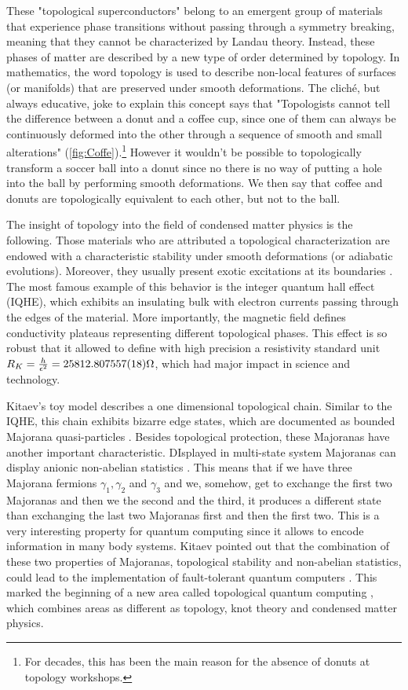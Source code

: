 These "topological superconductors" belong to an emergent group of materials that experience phase transitions without passing through a symmetry breaking, meaning that they cannot be characterized by Landau theory. Instead, these phases of matter are described by  a new type of  order determined by topology. In mathematics, the word topology is used to describe non-local features of surfaces (or manifolds) that are preserved under smooth deformations. The clich\'e, but always educative, joke to explain this concept says that "Topologists cannot tell the difference between a donut and a coffee cup, since one of them 
can always be continuously deformed into the other through a
sequence of smooth and small alterations" (\ref{fig:Coffe}).\footnote{For decades, this has been the main reason for the absence of donuts at topology workshops.} However it wouldn't be possible to topologically transform a soccer ball into  a donut since no there is no way of putting  a hole into the ball by performing smooth deformations. We then say that coffee and donuts are topologically equivalent to each other, but not to the ball. 



The insight of topology into  the field of condensed matter physics is the following. Those materials who are attributed a topological characterization are endowed with a characteristic stability under smooth deformations (or adiabatic evolutions). Moreover, they usually present exotic excitations at its boundaries . The most famous example of this behavior is the integer quantum hall effect (IQHE), which exhibits an insulating bulk with electron currents passing through the edges of the material. More importantly, the magnetic field defines conductivity plateaus representing different topological phases. This effect is so robust that it allowed to define with high precision a resistivity standard unit $ R_K =\frac{h}{\epsilon^2} = 25812.807557(18) \Omega$, which had major impact in science and technology. 


Kitaev's toy model describes a one dimensional  topological chain. Similar to the IQHE, this chain exhibits bizarre edge states, which are documented as bounded Majorana quasi-particles . Besides topological protection, these Majoranas have another important characteristic. DIsplayed in multi-state system Majoranas can display anionic non-abelian statistics \citep{kitaev_fault-tolerant_2003}. This means that if we have three Majorana fermions $\gamma_1 ,\gamma_2 $ and $\gamma_3$ and we, somehow, get to exchange the first two Majoranas and then we  the second and the third, it produces a different state than exchanging the last two Majoranas first and then the first two. This is a very interesting property for quantum computing since it allows to encode information in many body systems.  Kitaev pointed out that the combination of these two properties of Majoranas, topological stability and non-abelian statistics, could lead  to the implementation of fault-tolerant quantum computers . This marked the beginning of a new area called  topological quantum computing \cite{pachos_introduction_2012}, which combines areas as different as topology, knot theory \cite{turaev_book} and condensed matter physics. 

